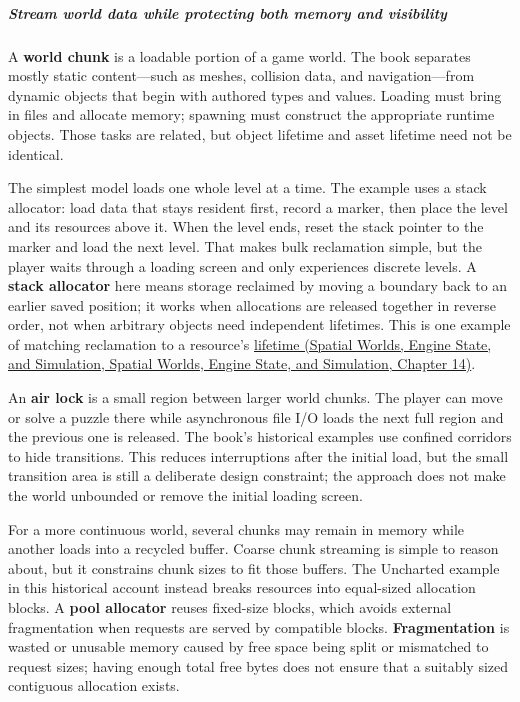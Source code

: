 \subparagraph{Stream world data while protecting both memory and visibility}\label{06-engine-ii-ch032-stream-world-data-while-protecting-both-memory-and-visibility}

A \textbf{world chunk} is a loadable portion of a game world. The book separates mostly static content---such as meshes, collision data, and navigation---from dynamic objects that begin with authored types and values. Loading must bring in files and allocate memory; spawning must construct the appropriate runtime objects. Those tasks are related, but object lifetime and asset lifetime need not be identical.

The simplest model loads one whole level at a time. The example uses a stack allocator: load data that stays resident first, record a marker, then place the level and its resources above it. When the level ends, reset the stack pointer to the marker and load the next level. That makes bulk reclamation simple, but the player waits through a loading screen and only experiences discrete levels. A \textbf{stack allocator} here means storage reclaimed by moving a boundary back to an earlier saved position; it works when allocations are released together in reverse order, not when arbitrary objects need independent lifetimes. This is one example of matching reclamation to a resource's \href{../05-Spatial-Worlds-Engine-State-and-Simulation/main.pdf\#nameddest=05-engine-i-ch014-give-memory-a-lifetime-that-matches-the-work}{lifetime (Spatial Worlds, Engine State, and Simulation, Spatial Worlds, Engine State, and Simulation, Chapter 14)}.

An \textbf{air lock} is a small region between larger world chunks. The player can move or solve a puzzle there while asynchronous file I/O loads the next full region and the previous one is released. The book's historical examples use confined corridors to hide transitions. This reduces interruptions after the initial load, but the small transition area is still a deliberate design constraint; the approach does not make the world unbounded or remove the initial loading screen.

For a more continuous world, several chunks may remain in memory while another loads into a recycled buffer. Coarse chunk streaming is simple to reason about, but it constrains chunk sizes to fit those buffers. The Uncharted example in this historical account instead breaks resources into equal-sized allocation blocks. A \textbf{pool allocator} reuses fixed-size blocks, which avoids external fragmentation when requests are served by compatible blocks. \textbf{Fragmentation} is wasted or unusable memory caused by free space being split or mismatched to request sizes; having enough total free bytes does not ensure that a suitably sized contiguous allocation exists.


